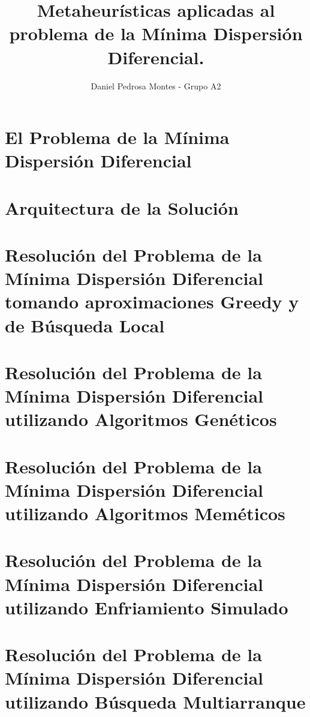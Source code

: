 \documentclass[10pt, a4paper]{aqademic}
\author{Daniel Pedrosa Montes - Grupo A2}
\title{Metaheurísticas aplicadas al problema de la Mínima Dispersión Diferencial.}
\begin{document}
\AqMaketitle[%
	cover    = identidad_ugr,
    dni      = {{DNI goes here}},
    email    = {{email goes here}},
	url      = https://github.com/moshidev/MH,
    date     = mayo del 2022
]

\tableofcontents

\chapter{El Problema de la Mínima Dispersión Diferencial}
    
    
\chapter{Arquitectura de la Solución}
    

\chapter{Resolución del Problema de la Mínima Dispersión Diferencial tomando aproximaciones Greedy y de Búsqueda Local}
    

\chapter{Resolución del Problema de la Mínima Dispersión Diferencial utilizando Algoritmos Genéticos}
    

\chapter{Resolución del Problema de la Mínima Dispersión Diferencial utilizando Algoritmos Meméticos}
    

\chapter{Resolución del Problema de la Mínima Dispersión Diferencial utilizando Enfriamiento Simulado}
    

\chapter{Resolución del Problema de la Mínima Dispersión Diferencial utilizando Búsqueda Multiarranque}
    
\end{document}
